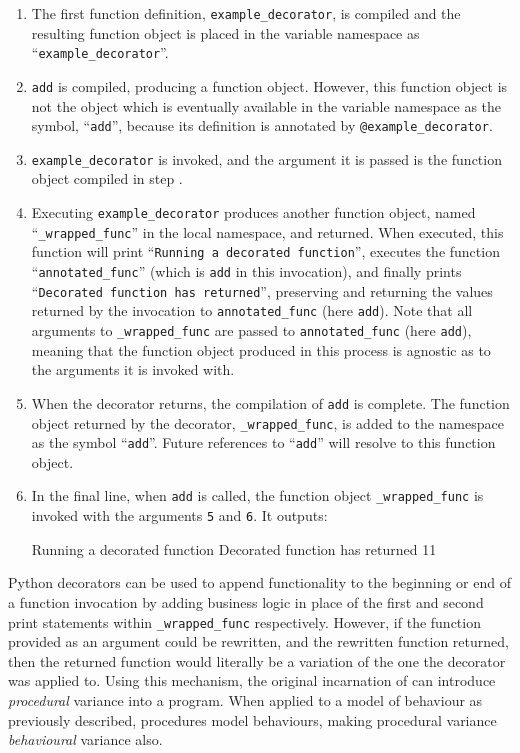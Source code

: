 \begin{enumerate}
    \item The first function definition, \lstinline{example_decorator}, is
    compiled and the resulting function object is placed in the variable
    namespace as ``\lstinline{example_decorator}''.
    \item \lstinline{add} is compiled, producing a function object. However,
    this function object is not the object which is eventually available in the
    variable namespace as the symbol, ``\lstinline{add}'', because its
    definition is annotated by \lstinline{@example_decorator}.
    \item \lstinline{example_decorator} is invoked, and the argument it is
    passed is the function object compiled in step .
    \item Executing \lstinline{example_decorator} produces another function
    object, named ``\lstinline{_wrapped_func}'' in the local namespace, and
    returned. When executed, this function will print
    ``\lstinline{Running a decorated function}'',
    executes the function ``\lstinline{annotated_func}''
    (which is \lstinline{add} in this invocation), and finally prints
    ``\lstinline{Decorated function has returned}'', preserving and returning
    the values returned by the invocation to \lstinline{annotated_func} (here
    \lstinline{add}). Note that all arguments to \lstinline{_wrapped_func} are
    passed to \lstinline{annotated_func} (here \lstinline{add}), meaning that
    the function object produced in this process is agnostic as to the arguments
    it is invoked with.
    \item When the decorator returns, the compilation of \lstinline{add} is
    complete. The function object returned by the decorator,
    \lstinline{_wrapped_func}, is added to the namespace as the symbol
    ``\lstinline{add}''. Future references to ``\lstinline{add}'' will resolve
    to this function object.
    \item In the final line, when \lstinline{add} is called, the function
    object \lstinline{_wrapped_func} is invoked with the arguments \lstinline{5}
    and \lstinline{6}. It outputs: \begin{blockquote}
    Running a decorated function
    Decorated function has returned
    11
    \end{blockquote}
\end{enumerate}

Python decorators can be used to append functionality to the beginning or end of
a function invocation by adding business logic in place of the first and second
print statements within \lstinline{_wrapped_func} respectively. However, if the
function provided as an argument could be rewritten, and the rewritten function
returned, then the returned function would literally be a variation of the one
the decorator was applied to. Using this mechanism, the original incarnation of
\pdsf can introduce \emph{procedural} variance into a program. When applied to a
model of behaviour as previously described, procedures model behaviours, making
procedural variance \emph{behavioural} variance also. 

